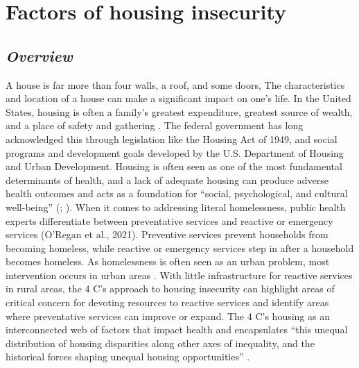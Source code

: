 \chapter{Factors of housing insecurity}	%
\section{\textit{Overview}}
A house is far more than four walls, a roof, and some doors, The characteristics and location of a house can make a significant impact on one’s life. In the United States, housing is often a family’s greatest expenditure, greatest source of wealth, and a place of safety and gathering \citep{braveman_housing_2011}. The federal government has long acknowledged this through legislation like the Housing Act of 1949, and social programs and development goals developed by the U.S. Department of Housing and Urban Development. Housing is often seen as one of the most fundamental determinants of health, and a lack of adequate housing can produce adverse health outcomes and acts as a foundation for “social, psychological, and cultural well-being” (\citealp[p.17]{dalessandro_housing_2020}; \citealp{leifheit_building_2022}). When it comes to addressing literal homelessness, public health experts differentiate between preventative services and reactive or emergency services (O’Regan et al., 2021). Preventive services prevent households from becoming homeless, while reactive or emergency services step in after a household becomes homeless. As homelessness is often seen as an urban problem, most intervention occurs in urban areas \citep{gleason_using_2021}. With little infrastructure for reactive services in rural areas, the 4 C’s approach to housing insecurity can highlight areas of critical concern for devoting resources to reactive services and identify areas where preventative services can improve or expand. The 4 C’s housing as an interconnected web of factors that impact health and encapsulates “this unequal distribution of housing disparities along other axes of inequality, and the historical forces shaping unequal housing opportunities” \citep[1]{hernandez_housing_2019}.  

